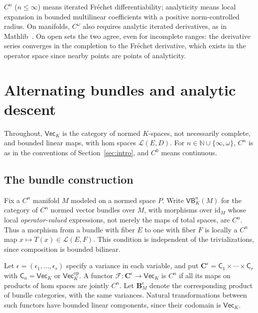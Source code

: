 \documentclass[11pt]{amsart}
\theoremstyle{definition}
\theoremstyle{remark}
\numberwithin{equation}{section}
\newcommand{\N}{\mathbb N}
\newcommand{\cL}{\mathcal L}
\newcommand{\id}{\mathrm{id}}
\theoremstyle{plain}
\theoremstyle{definition}
\theoremstyle{plain}
\begin{document}
$C^n$ ($n\le\infty$) means iterated Fr\'echet differentiability; analyticity means local expansion in bounded
multilinear coefficients with a positive norm-controlled radius. On manifolds, $C^\omega$ also requires analytic
iterated derivatives, as in Mathlib~\cite{docs}. On open sets the two agree, even for incomplete ranges: the
derivative series converges in the completion to the Fr\'echet derivative, which exists in the operator space since
nearby points are points of analyticity.
\section{Alternating bundles and analytic descent}\label{sec:bundles}

Throughout, $\mathsf{Vec}_K$ is the category of normed $K$-spaces, not necessarily complete, and bounded linear maps, with hom spaces $\cL(E,D)$. For $n\in\N\cup\{\infty,\omega\}$, $C^n$ is as in the conventions of Section~\ref{sec:intro}, and $C^0$ means continuous.

\subsection{The bundle construction}

Fix a $C^n$ manifold $M$ modeled on a normed space $P$. Write $\mathsf{VB}^n_K(M)$ for the category of $C^n$ normed vector bundles over $M$, with morphisms over $\id_M$ whose local \emph{operator-valued} expressions, not merely the maps of total spaces, are $C^n$. Thus a morphism from a bundle with fiber $E$ to one with fiber $F$ is locally a $C^n$ map $x\mapsto T(x)\in\cL(E,F)$. This condition is independent of the trivializations, since composition is bounded bilinear.

Let $\epsilon=(\epsilon_1,\ldots,\epsilon_r)$ specify a variance in each variable, and put $\mathbf C^\epsilon=\mathsf C_1\times\cdots\times\mathsf C_r$ with $\mathsf C_a=\mathsf{Vec}_K$ or $\mathsf{Vec}_K^{\mathrm{op}}$. A functor $\mathcal F\colon\mathbf C^\epsilon\to\mathsf{Vec}_K$ is $C^n$ if all its maps on products of hom spaces are jointly $C^n$. Let $\mathbf B^\epsilon_M$ denote the corresponding product of bundle categories, with the same variances. Natural transformations between such functors have bounded linear components, since their codomain is $\mathsf{Vec}_K$.
\end{document}
